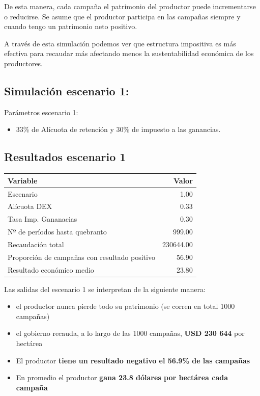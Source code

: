 \documentclass[
  12pt,
  spanish,
  10pt]{article}
\providecommand{\tightlist}{%
  \setlength{\itemsep}{0pt}\setlength{\parskip}{0pt}}
\begin{document}
De esta manera, cada campaña el patrimonio del productor puede
incrementarse o reducirse. Se asume que el productor participa en las
campañas siempre y cuando tengo un patrimonio neto positivo.

A través de esta simulación podemos ver que estructura impositiva es más
efectiva para recaudar más afectando menos la sustentabilidad económica
de los productores.

\hypertarget{simulaciuxf3n-escenario-1}{%
\subsection{Simulación escenario 1:}\label{simulaciuxf3n-escenario-1}}

Parámetros escenario 1:

\begin{itemize}
\tightlist
\item
  33\% de Alícuota de retención y 30\% de impuesto a las ganancias.
\end{itemize}

\hypertarget{resultados-escenario-1}{%
\subsection{Resultados escenario 1}\label{resultados-escenario-1}}

\begin{longtable}[]{@{}lr@{}}
\toprule
Variable & Valor\tabularnewline
\midrule
\endhead
Escenario & 1.00\tabularnewline
Alícuota DEX & 0.33\tabularnewline
Tasa Imp. Gananacias & 0.30\tabularnewline
Nº de períodos hasta quebranto & 999.00\tabularnewline
Recaudación total & 230644.00\tabularnewline
Proporción de campañas con resultado positivo & 56.90\tabularnewline
Resultado económico medio & 23.80\tabularnewline
\bottomrule
\end{longtable}

Las salidas del escenario 1 se interpretan de la siguiente manera:

\begin{itemize}
\tightlist
\item
  el productor nunca pierde todo su patrimonio (se corren en total 1000
  campañas)
\item
  el gobierno recauda, a lo largo de las 1000 campañas, \textbf{USD 230
  644} por hectárea
\item
  El productor \textbf{tiene un resultado negativo el 56.9\% de las
  campañas}
\item
  En promedio el productor \textbf{gana 23.8 dólares por hectárea cada
  campaña}
\end{itemize}
\end{document}
